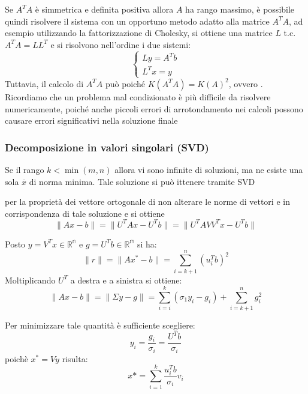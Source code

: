 Se $ A^T A$ è simmetrica e definita positiva allora $A$ ha rango massimo, è possibile quindi risolvere il sistema con un opportuno metodo adatto alla matrice $A^T A$, ad esempio utilizzando la fattorizzazione di Cholesky, si ottiene una matrice $L$ t.c. $A^T A = LL^T$ e si risolvono nell’ordine i due sistemi:
\[
    \begin{cases}
        Ly = A^T b \\
        L^Tx = y  
    \end{cases}
\]
Tuttavia, il calcolo di $A^TA$ può  poiché $K(A^TA) = K(A)^2$, ovvero . Ricordiamo che un problema mal condizionato è più difficile da risolvere numericamente, poiché anche piccoli errori di arrotondamento nei calcoli possono causare errori significativi nella soluzione finale

\subsubsection{Decomposizione in valori singolari (SVD)}
Se il rango $k<\min(m,n)$ allora vi sono infinite di soluzioni, ma ne esiste una sola $\overline{x}$ di norma minima. Tale soluzione si può ittenere tramite SVD


per la proprietà dei vettore ortogonale di non alterare le norme di vettori e in corrispondenza di tale soluzione e si ottiene 
\[
    \|Ax-b\| = \|U^TAx-U^Tb\| = \|U^T AVV^T x - U^Tb\|
\]

Posto $y = V^T x \in \mathbb{R^n}$ e $g=U^Tb\in \mathbb{R^m}$ si ha:
\[
    \|r\| = \|Ax^* - b\|= \sum_{i=k+1}^{n}(u^T_i b)^2
\]
Moltiplicando $U^T$ a destra e a sinistra si ottiene:
\[
    \|Ax-b\|=\|\Sigma y- g\| = \sum^k_{i=i}(\sigma_1y_i - g_i) + \sum^n_{i=k+1} g^2_i
\]

Per minimizzare tale quantità è sufficiente scegliere:
\[
    y_i = \frac{g_i}{\sigma_i} = \frac{U^T b}{\sigma_i}    
\]
poichè $x^* =Vy$ risulta:
\[
    x*=\sum_{i=1}^{k} \frac{u^T_i b }{\sigma_i}v_i   
\]

